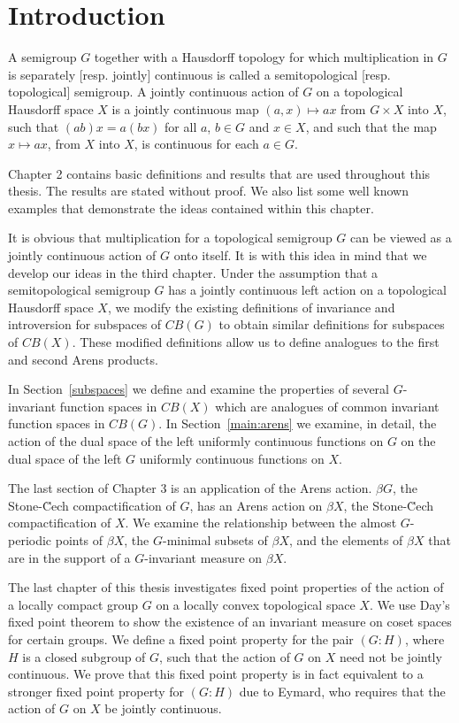 \chapter{Introduction}
A semigroup $G$ together with a Hausdorff topology for which multiplication
in $G$ is separately [resp. jointly] continuous is called a semitopological
[resp. topological] semigroup.
A jointly continuous action of $G$ on a topological Hausdorff space $X$ is
a jointly continuous  map $(a,x) \mapsto ax$ from $G\times X$ into $X$, such that
$(ab)x = a(bx)$ for all $a$, $b\in G$ and $x\in X$, and such that the map 
$x\mapsto ax$, from $X$ 
into $X$, is continuous for each $a\in G$.

Chapter 2 contains basic definitions and results that are used throughout this thesis.
The results are stated without proof.  We also list some well known examples
that demonstrate the ideas contained within this chapter.

It is obvious that multiplication for a topological semigroup $G$ can be
viewed as a jointly continuous action of $G$ onto itself.
It is with this
idea in mind that we develop our ideas in the third chapter.
Under the assumption that a semitopological semigroup $G$ has a jointly continuous
left action on a topological Hausdorff space $X$, we modify the existing definitions
of invariance and introversion for subspaces of $CB(G)$ to obtain similar definitions
for subspaces of $CB(X)$.  These modified definitions allow us to define analogues
to the first and second Arens products.

In Section~\ref{subspaces} we define and examine the properties of several $G$-invariant function spaces
in $CB(X)$ which are analogues of common invariant function spaces in $CB(G)$.
In Section~\ref{main:arens} we examine, in detail,
the action of the dual space of the left uniformly continuous functions on $G$
on the dual space of the left $G$ uniformly continuous functions on $X$.
 
The last section of Chapter 3 is an application of the Arens action.
$\beta G$, the Stone-\u{Cech} compactification of $G$, has an Arens 
action on $\beta X$, the Stone-\u{Cech} compactification of $X$.
We examine the relationship between the almost $G$-periodic points of 
$\beta X$,
the $G$-minimal subsets of $\beta X$, and the elements of $\beta X$ that 
are in the support of a $G$-invariant measure on $\beta X$.

The last chapter of this thesis investigates fixed point properties
of the action of a locally compact group $G$ on a locally convex topological space $X$.
We use Day's fixed point theorem to show the existence of an invariant
measure on coset spaces for certain groups.
We define a fixed point property for the pair $(G:H)$, where $H$ is a closed
subgroup of $G$, such that the
action of $G$ on $X$ need not be jointly continuous.
We prove that this fixed point property is in fact equivalent to a stronger
fixed point property for $(G:H)$ due to Eymard, who requires that the action of $G$ on $X$
be jointly continuous.